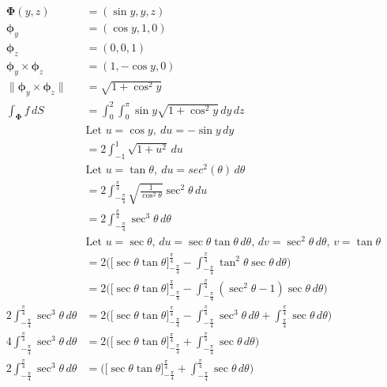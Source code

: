 \documentclass{article}
\newcommand{\norm}[1]{\| #1 \|}
\begin{document}
\begin{enumerate}
\begin{enumerate}
        \begin{align*}
            \boldsymbol \Phi (y,z) &= (\sin y, y, z) \\
            \boldsymbol \phi_y &= (\cos y, 1, 0) \\
            \boldsymbol \phi_z &= (0,0,1) \\
            \boldsymbol \phi_y \times \boldsymbol \phi_z &= (1, -\cos y, 0) \\
            \norm{ \boldsymbol \phi_y \times \boldsymbol \phi_z } &= \sqrt{1 +  \cos^2 y} \\
            \int_{\boldsymbol \Phi}f\, dS &= \int_0^2 \int_0^{\pi} \sin y \sqrt{1 + \cos^2 y} \, dy \, dz \\
            &\text{Let }u = \cos y ,\: du = - \sin y \,dy \\
            &= 2\int_{-1}^{1} \sqrt{1 + u^2} \, du \\
            &\text{Let }u = \tan \theta ,\: du = sec^2 (\theta) \,d\theta \\
            &= 2\int_{-\frac{\pi}{4}}^{\frac{\pi}{4}} \sqrt{\frac{1}{\cos^2 \theta}} \sec^2\theta\, du  \\
            &= 2\int_{-\frac{\pi}{4}}^{\frac{\pi}{4}} \sec^3\theta\, d\theta  \\
            &\text{Let } u = \sec \theta ,\, du = \sec \theta \tan \theta \, d\theta ,\, dv = \sec^2 \theta \, d\theta,\, v = \tan \theta  \\
            &=2 \Big( \Big[ \sec \theta \tan \theta \Big]_{-\frac{\pi}{4}}^{\frac{\pi}{4}} - \int_{-\frac{\pi}{4}}^{\frac{\pi}{4}} \tan^2 \theta \sec \theta \, d \theta \Big) \\
             &=2 \Big( \Big[ \sec \theta \tan \theta \Big]_{-\frac{\pi}{4}}^{\frac{\pi}{4}} - \int_{-\frac{\pi}{4}}^{\frac{\pi}{4}} (\sec^2 \theta - 1 )\sec \theta \, d \theta \Big) \\
             2\int_{-\frac{\pi}{4}}^{\frac{\pi}{4}} \sec^3\theta\, d\theta   &=2 \Big( \Big[ \sec \theta \tan \theta \Big]_{-\frac{\pi}{4}}^{\frac{\pi}{4}} - \int_{-\frac{\pi}{4}}^{\frac{\pi}{4}} \sec^3 \theta \, d \theta  + \int_{\frac{\pi}{4}}^{\frac{\pi}{4}} \sec \theta \, d \theta \Big) \\
             4\int_{-\frac{\pi}{4}}^{\frac{\pi}{4}} \sec^3\theta\, d\theta   &=2 \Big( \Big[ \sec \theta \tan \theta \Big]_{-\frac{\pi}{4}}^{\frac{\pi}{4}} + \int_{-\frac{\pi}{4}}^{\frac{\pi}{4}} \sec \theta \, d \theta \Big) \\
             2\int_{-\frac{\pi}{4}}^{\frac{\pi}{4}} \sec^3\theta\, d\theta   &= \Big( \Big[ \sec \theta \tan \theta \Big]_{-\frac{\pi}{4}}^{\frac{\pi}{4}} + \int_{-\frac{\pi}{4}}^{\frac{\pi}{4}} \sec \theta \, d \theta \Big) \\

\end{align*}
\end{enumerate}
\end{enumerate}
\end{document}
